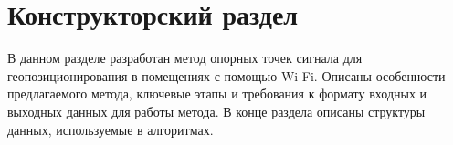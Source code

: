 \chapter{Конструкторский раздел}

В данном разделе разработан метод опорных точек сигнала для геопозиционирования в помещениях с помощью Wi-Fi. Описаны особенности предлагаемого метода, ключевые этапы и требования к формату входных и выходных данных для работы метода. В конце раздела описаны структуры данных, используемые в алгоритмах.
